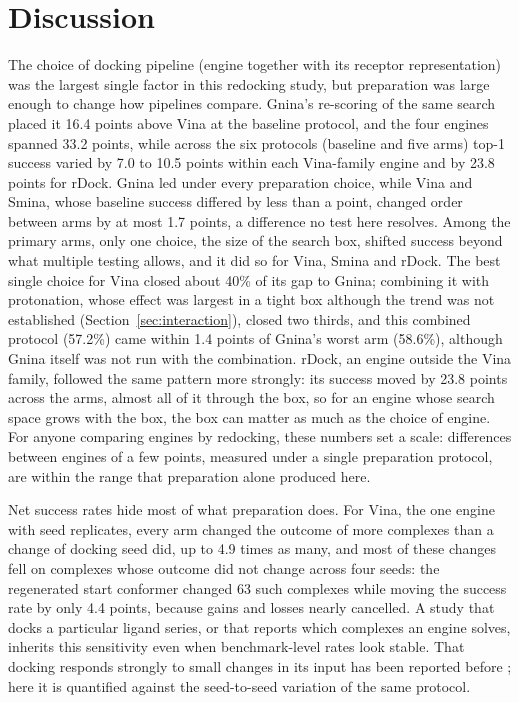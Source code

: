 \section{Discussion}
\label{sec:discussion}

The choice of docking pipeline (engine together with its receptor representation) was the
largest single factor in this redocking study, but preparation was large enough to change
how pipelines compare. Gnina's re-scoring of the same search
placed it 16.4 points above Vina at the baseline protocol, and the four engines spanned
33.2 points, while across the six protocols (baseline and five arms) top-1 success varied
by 7.0 to 10.5 points within each Vina-family engine and by 23.8 points for rDock. Gnina
led under every preparation choice, while Vina and Smina, whose baseline success differed
by less than a point, changed order between arms by at most 1.7 points, a difference no
test here resolves. Among the primary arms, only one choice, the size
of the search box, shifted success beyond what multiple testing allows, and it did so for
Vina, Smina and rDock. The best single choice for Vina closed about 40\% of its gap to Gnina;
combining it with protonation, whose effect was largest in a tight box although the trend
was not established (Section~\ref{sec:interaction}), closed two thirds, and this combined protocol (57.2\%)
came within 1.4 points of Gnina's worst arm (58.6\%), although Gnina itself was not run
with the combination. rDock, an engine outside the Vina family, followed the same pattern
more strongly: its success moved by 23.8 points across the arms, almost all of it through
the box, so for an engine whose search space grows with the box, the box can matter as
much as the choice of engine. For anyone comparing engines by redocking, these numbers set a scale: differences
between engines of a few points, measured under a single preparation protocol, are within
the range that preparation alone produced here.

Net success rates hide most of what preparation does. For Vina, the one engine with seed
replicates, every arm changed the outcome of more complexes than a change of docking seed
did, up to 4.9 times as many, and most of these changes fell on complexes whose outcome
did not change across four seeds: the regenerated start
conformer changed 63 such complexes while moving the success rate by only 4.4 points,
because gains and losses nearly cancelled. A study that docks a particular ligand series,
or that reports which complexes an engine solves, inherits this sensitivity even when
benchmark-level rates look stable. That docking responds strongly to small changes in its
input has been reported before \citep{feher2012chaotic}; here it is quantified against the
seed-to-seed variation of the same protocol.

